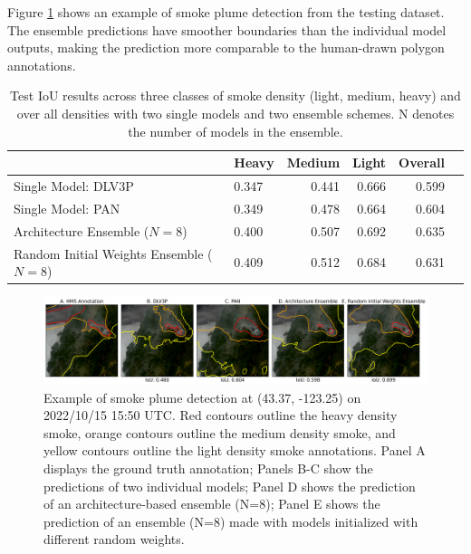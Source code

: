 \documentclass{article}
\begin{document}
Figure \ref{fig:ensemble_panel} shows an example of smoke plume detection from the testing dataset. The ensemble predictions have smoother boundaries than the individual model outputs, making the prediction more comparable to the human-drawn polygon annotations.
\begin{table}[h]
    \centering
    \caption{Test IoU results across three classes of smoke density (light, medium, heavy) and over all densities with two single models and two ensemble schemes. N denotes the number of models in the ensemble.}
    \label{tab:results}
    \begin{tabular}{llrrr>{\bfseries}r}
        \hline
            &   Heavy &   Medium &   Light &   Overall \\
        \hline
        Single Model: DLV3P \citep{dlv3p} &   0.347 &     0.441 &  0.666 &      0.599  \\
        Single Model: PAN \citep{PAN} &  0.349 &     0.478 &  0.664 &      0.604 \\
        Architecture Ensemble ($N=8$) &   0.400 &     0.507 &  0.692 &      0.635 \\
        Random Initial Weights Ensemble ($N=8$) &  0.409 &     0.512 &  0.684 &      0.631 \\
         \hline
    \end{tabular}
    \end{table}

\begin{figure}[h]
    \centering
    \includegraphics[width=\textwidth]{ensemble_panel_tinypaper.png}
    \caption{Example of smoke plume detection at (43.37, -123.25) on 2022/10/15 15:50 UTC. Red contours outline the heavy density smoke, orange contours outline the medium density smoke, and yellow contours outline the light density smoke annotations. Panel A displays the ground truth annotation; Panels B-C show the predictions of two individual models; Panel D shows the prediction of an architecture-based ensemble (N=8); Panel E shows the prediction of an ensemble (N=8) made with models initialized with different random weights.}
    \label{fig:ensemble_panel}
\end{figure}
\end{document}
